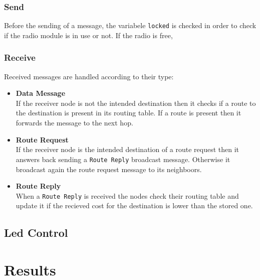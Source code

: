 \documentclass[11pt]{article}
\begin{document}
\subsubsection{Send}
Before the sending of a message, the variabele \texttt{locked} is checked in order to check if the radio module is in use or not.
If the radio is free, 
\subsubsection{Receive}
Received messages are handled according to their type:
\begin{itemize}
	\item{\textbf{Data Message}}\\
		If the receiver node is not the intended destination then it checks if a route to the destination is present in its routing table.
		If a route is present then it forwards the message to the next hop.
	\item{\textbf{Route Request}}\\
		If the receiver node is the intended destination of a route request then it answers back sending a \texttt{Route Reply} broadcast message.
		Otherwise it broadcast again the route request message to its neighboors.
		
	\item{\textbf{Route Reply}}\\
		When a \texttt{Route Reply} is received the nodes check their routing table and update it if the recieved cost for the destination is lower than the stored one.  
\end{itemize}
\subsection{Led Control}
\section{Results}
\end{document}
